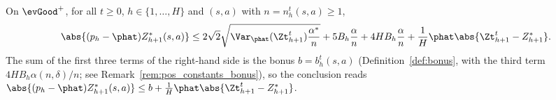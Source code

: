 \begin{lemma}\label{lem:concentration_pos}
\leanok
{}
On $\evGood^+$, for all $t \ge 0$, $h \in \{1, \dots, H\}$ and $(s,a)$ with $n = n_h^t(s,a) \ge 1$,
\[
  \abs{(p_h - \phat) Z^*_{h+1}(s,a)}
  \le 2\sqrt2 \sqrt{\Var_{\phat}(\Zt^t_{h+1}) \frac{\alpha^*}{n}}
  + 5 B_h \frac{\alpha}{n} + 4 H B_h \frac{\alpha}{n}
  + \frac1H \phat \abs{\Zt^t_{h+1} - Z^*_{h+1}} .
\]
The sum of the first three terms of the right-hand side is the bonus $b = b_h^t(s,a)$
(Definition~\ref{def:bonus}, with the third term $4 H B_h \alpha(n,\delta)/n$; see
Remark~\ref{rem:pos_constants_bonus}), so the conclusion reads
$\abs{(p_h - \phat) Z^*_{h+1}(s,a)} \le b + \frac1H \phat\abs{\Zt^t_{h+1} - Z^*_{h+1}}$.
\end{lemma}


